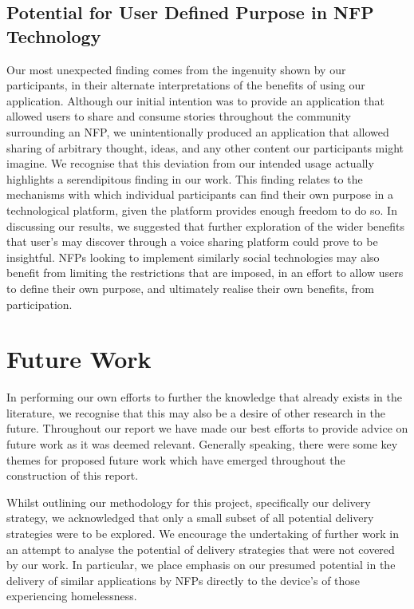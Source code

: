 \subsection{Potential for User Defined Purpose in NFP Technology}

Our most unexpected finding comes from the ingenuity shown by our participants, in their alternate interpretations of the benefits of using our application. Although our initial intention was to provide an application that allowed users to share and consume stories throughout the community surrounding an NFP, we unintentionally produced an application that allowed sharing of arbitrary thought, ideas, and any other content our participants might imagine. We recognise that this deviation from our intended usage actually highlights a serendipitous finding in our work. This finding relates to the mechanisms with which individual participants can find their own purpose in a technological platform, given the platform provides enough freedom to do so. In discussing our results, we suggested that further exploration of the wider benefits that user's may discover through a voice sharing platform could prove to be insightful. NFPs looking to implement similarly social technologies may also benefit from limiting the restrictions that are imposed, in an effort to allow users to define their own purpose, and ultimately realise their own benefits, from participation.

\section{Future Work}

In performing our own efforts to further the knowledge that already exists in the literature, we recognise that this may also be a desire of other research in the future. Throughout our report we have made our best efforts to provide advice on future work as it was deemed relevant. Generally speaking, there were some key themes for proposed future work which have emerged throughout the construction of this report.

Whilst outlining our methodology for this project, specifically our delivery strategy, we acknowledged that only a small subset of all potential delivery strategies were to be explored. We encourage the undertaking of further work in an attempt to analyse the potential of delivery strategies that were not covered by our work. In particular, we place emphasis on our presumed potential in the delivery of similar applications by NFPs directly to the device's of those experiencing homelessness.

